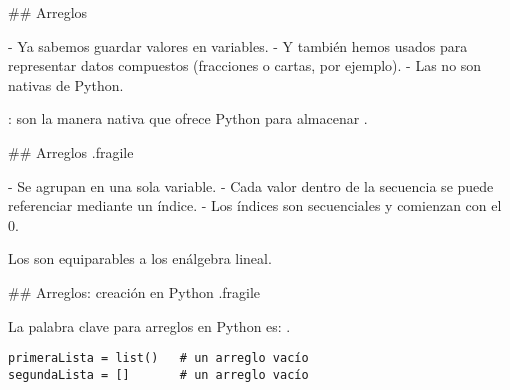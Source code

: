 ## Arreglos

- Ya sabemos guardar valores en variables.
- Y también hemos usados  para representar datos compuestos (fracciones o cartas, por ejemplo).
    - Las  no son nativas de Python.

\pause

\bgnblockdefinition
{}: son la manera nativa que ofrece Python para almacenar .
\trmblockdefinition

## Arreglos {.fragile}


- Se agrupan en una sola variable.
- Cada valor dentro de la secuencia se puede referenciar mediante un índice.
    - Los índices son secuenciales y comienzan con el 0.


\begin{center}
\vspace{-2ex}
\end{center}

\bgnblockidea
Los  son equiparables a los  en\newline álgebra lineal.
\trmblockidea

## Arreglos: creación en Python {.fragile}

\bgnblockdefinition
La palabra clave para arreglos en Python es: .
\trmblockdefinition


\begin{lstlisting}[style=frame02]
primeraLista = list()   # un arreglo vacío
segundaLista = []       # un arreglo vacío
\end{lstlisting}


